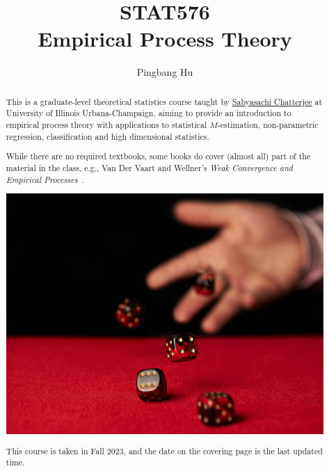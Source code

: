 \documentclass[a4paper]{report}
\author{Pingbang Hu}
\title{STAT576\\Empirical Process Theory}
\begin{document}
\maketitle

\begin{abstract}
  This is a graduate-level theoretical statistics course taught by \href{https://sabyasachi.web.illinois.edu/}{Sabyasachi Chatterjee} at University of Illinois Urbana-Champaign, aiming to provide an introduction to empirical process theory with applications to statistical \(M\)-estimation, non-parametric regression, classification and high dimensional statistics.

  While there are no required textbooks, some books do cover (almost all) part of the material in the class, e.g., Van Der Vaart and Wellner's \emph{Weak Convergence and Empirical Processes}~\cite{vandervaartWeakConvergenceEmpirical1996}.

  \vfill
  \begin{center}
    \includegraphics[width=.8\linewidth]{Figures/cover.png}
  \end{center}
  \vfill
  This course is taken in Fall 2023, and the date on the covering page is the last updated time.
\end{abstract}

\tableofcontents


\newpage
\appendix
\appendixpage{}



\newpage
\printbibliography{}
\end{document}
